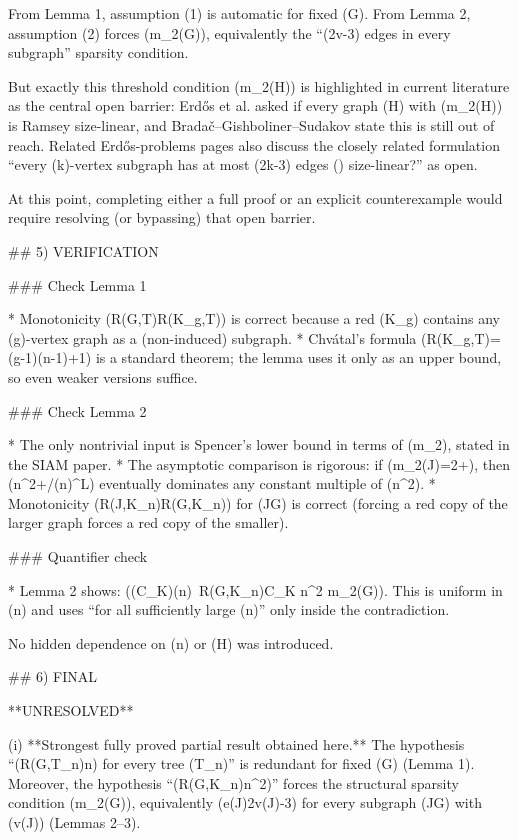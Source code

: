 From Lemma 1, assumption (1) is automatic for fixed (G).
From Lemma 2, assumption (2) forces (m_2(G)), equivalently the “(2v-3) edges in every subgraph” sparsity condition.

But exactly this threshold condition (m_2(H)) is highlighted in current literature as the central open barrier: Erdős et al. asked if every graph (H) with (m_2(H)) is Ramsey size-linear, and Bradač–Gishboliner–Sudakov state this is still out of reach.
Related Erdős-problems pages also discuss the closely related formulation “every (k)-vertex subgraph has at most (2k-3) edges (\Rightarrow) size-linear?” as open.

At this point, completing either a full proof or an explicit counterexample would require resolving (or bypassing) that open barrier.

## 5) VERIFICATION

### Check Lemma 1

* Monotonicity (R(G,T)\le R(K_g,T)) is correct because a red (K_g) contains any (g)-vertex graph as a (non-induced) subgraph.
* Chvátal’s formula (R(K_g,T)=(g-1)(n-1)+1) is a standard theorem; the lemma uses it only as an upper bound, so even weaker versions suffice.

### Check Lemma 2

* The only nontrivial input is Spencer’s lower bound in terms of (m_2), stated in the SIAM paper.
* The asymptotic comparison is rigorous: if (m_2(J)=2+\varepsilon), then (n^{2+\varepsilon}/(\log n)^L) eventually dominates any constant multiple of (n^2).
* Monotonicity (R(J,K_n)\le R(G,K_n)) for (J\subseteq G) is correct (forcing a red copy of the larger graph forces a red copy of the smaller).

### Quantifier check

* Lemma 2 shows: ((\exists C_K)(\forall n)\ R(G,K_n)\le C_K n^2 \Rightarrow m_2(G)). This is uniform in (n) and uses “for all sufficiently large (n)” only inside the contradiction.

No hidden dependence on (n) or (H) was introduced.

## 6) FINAL

**UNRESOLVED**

(i) **Strongest fully proved partial result obtained here.**
The hypothesis “(R(G,T_n)\ll n) for every tree (T_n)” is redundant for fixed (G) (Lemma 1). Moreover, the hypothesis “(R(G,K_n)\ll n^2)” forces the structural sparsity condition (m_2(G)), equivalently (e(J)\le 2v(J)-3) for every subgraph (J\subseteq G) with (v(J)) (Lemmas 2–3).

